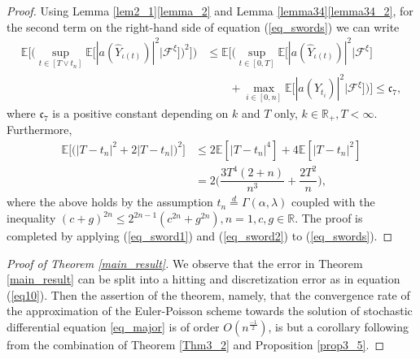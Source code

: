 \begin{proof}
Using Lemma \ref{lem2_1}\ref{lemma_2} and Lemma \ref{lemma34}\ref{lemma34_2}, for the second term on the right-hand side of equation (\ref{eq_swords}) we can write
\begin{equation}\label{eq_sword1}
    \begin{split}
        \mathbb{E} \bigg[\bigg(\sup_{t \in [T \lor t_n]}\mathbb{E} \big[|a(\hat{Y}_{\iota(t)})|^2|\mathcal{F}^{\xi}\big]\bigg)^2\bigg] \Bigg) 
        &\leq  \mathbb{E} \Bigg[\bigg( \sup_{t \in [0, T]}\mathbb{E} \big[|a(\hat{Y}_{\iota(t)})|^2|\mathcal{F}^{\xi}\big]\\
        &\qquad+ \max_{i \in [0, n]} \mathbb{E}\big[|a(\hat{Y}_{t_{i}})|^2 |\mathcal{F}^{\xi}\big]\bigg)\Bigg] \leq \mathfrak{c}_7,
    \end{split}
\end{equation}
where $\mathfrak{c}_7 $ is a positive constant depending on $k$ and $T$ only, $ k \in \mathbb{R}_+, T < \infty$. Furthermore, 
\begin{equation}\label{eq_sword2}
    \begin{split}
         \mathbb{E} \big[ \big(|T -  t_n|^2 + 2|T-t_n|\big)^2\big] &\leq 2 \mathbb{E}[|T -  t_n|^4] + 4 \mathbb{E}[|T -  t_n|^2]\\
         &= 2 \bigg( \dfrac{3T^4(2+n)}{n^3} + \dfrac{2T^2}{n}\bigg),
    \end{split}
\end{equation}
where the above holds  by the assumption $t_n \overset{d}{=} \Gamma(\alpha, \lambda)$ coupled with the inequality $ (c + g)^{2n} \leq 2^{2n-1}(c^{2n} + g^{2n}), n=1, c,g \in \mathbb{R}$. The proof is completed by applying (\ref{eq_sword1}) and (\ref{eq_sword2}) to (\ref{eq_swords}).
\end{proof}
\begin{proof}[Proof of Theorem \ref{main_result}]
We observe that the error in Theorem \ref{main_result} can be split into a hitting and discretization error as in equation (\ref{eq10}). Then the assertion of the theorem, namely, that the convergence rate of the approximation of the Euler-Poisson scheme towards the solution of stochastic differential equation \eqref{eq_major} is of order $O(n^{\frac{-1}{2}})$, is but a corollary following from the combination of Theorem \ref{Thm3_2} and Proposition \ref{prop3_5}.
\end{proof}




